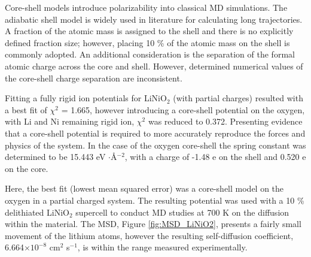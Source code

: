 \documentclass[aps,prb,twocolumn,superscriptaddress,reprint]{revtex4-1}
\begin{document}
Core-shell models introduce polarizability into classical MD simulations. The adiabatic shell model \cite{Mitchell_1993} is widely used in literature \cite{Hart1998, Fisher2010, Lewis_1985,Ammundsen1999, Kerisit2014, He2019,lee2012atomistic} for calculating long trajectories. A fraction of the atomic mass is assigned to the shell and there is no explicitly defined fraction size; however, placing 10 \% of the atomic mass on the shell is commonly adopted. \cite{PLIMPTON19951,todorov2006dl_poly_3} An additional consideration is the separation of the formal atomic charge across the core and shell. However, determined numerical values of the core-shell charge separation are inconsistent. \cite{wang2014molecular,escribano2017enhancing,lee2012atomistic,Lee2013_lithium,dai2019comparison}

Fitting a fully rigid ion potentials for LiNiO$_2$ (with partial charges) resulted with a best fit of $\chi^2$ = 1.665, however introducing a core-shell potential on the oxygen, with Li and Ni remaining rigid ion, $\chi^2$ was reduced to 0.372. Presenting evidence that a core-shell potential is required to more accurately reproduce the forces and physics of the system. In the case of the oxygen core-shell the spring constant was determined to be 15.443 eV $\cdot$\AA$^{-2}$, with a charge of -1.48 e on the shell and 0.520 e on the core.

Here, the best fit (lowest mean squared error) was a core-shell model on the oxygen in a partial charged system. The resulting potential was used with a 10 \% delithiated LiNiO$_2$ supercell to conduct MD studies at 700 K on the diffusion within the material. The MSD, Figure \ref{fig:MSD_LiNiO2}, presents a fairly small movement of the lithium atoms, however the resulting self-diffusion coefficient, 6.664$\times 10^{-8}$  cm$^{2}$ s$^{-1}$, is within the range measured experimentally. \cite{Nakamura2000}
\end{document}
